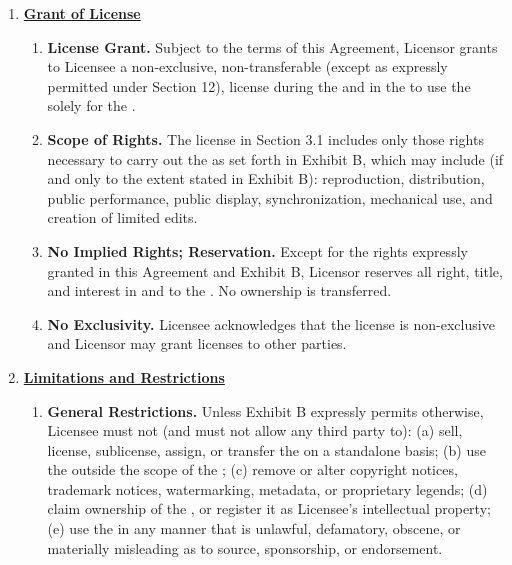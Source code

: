 \begin{enumerate}[leftmargin=*, label=\arabic*.]
	\item \textbf{\uline{Grant of License}}

	\begin{enumerate}[leftmargin=*, label=\arabic{enumi}.\arabic*]
		\item \textbf{License Grant.} Subject to the terms of this Agreement, Licensor grants to
		Licensee a non-exclusive, non-transferable (except as expressly permitted under Section
		12), license during the \termDef and in the \territory to use the \licensedIP solely for
		the \permittedUses.

		\item \textbf{Scope of Rights.} The license in Section 3.1 includes only those rights
		necessary to carry out the \permittedUses as set forth in Exhibit B, which may include
		(if and only to the extent stated in Exhibit B): reproduction, distribution, public
		performance, public display, synchronization, mechanical use, and creation of limited
		edits.

		\item \textbf{No Implied Rights; Reservation.} Except for the rights expressly granted in
		this Agreement and Exhibit B, Licensor reserves all right, title, and interest in and to
		the \licensedIP. No ownership is transferred.

		\item \textbf{No Exclusivity.} Licensee acknowledges that the license is non-exclusive
		and Licensor may grant licenses to other parties.
	\end{enumerate}

	\item \textbf{\uline{Limitations and Restrictions}}

	\begin{enumerate}[leftmargin=*, label=\arabic{enumi}.\arabic*]
		\item \textbf{General Restrictions.} Unless Exhibit B expressly permits otherwise,
		Licensee must not (and must not allow any third party to): (a) sell, license,
		sublicense, assign, or transfer the \licensedIP on a standalone basis; (b) use the
		\licensedIP outside the scope of the \permittedUses; (c) remove or alter copyright
		notices, trademark notices, watermarking, metadata, or proprietary legends; (d) claim
		ownership of the \licensedIP, or register it as Licensee's intellectual property; (e)
		use the \licensedIP in any manner that is unlawful, defamatory, obscene, or materially
		misleading as to source, sponsorship, or endorsement.


\end{enumerate}
\end{enumerate}
